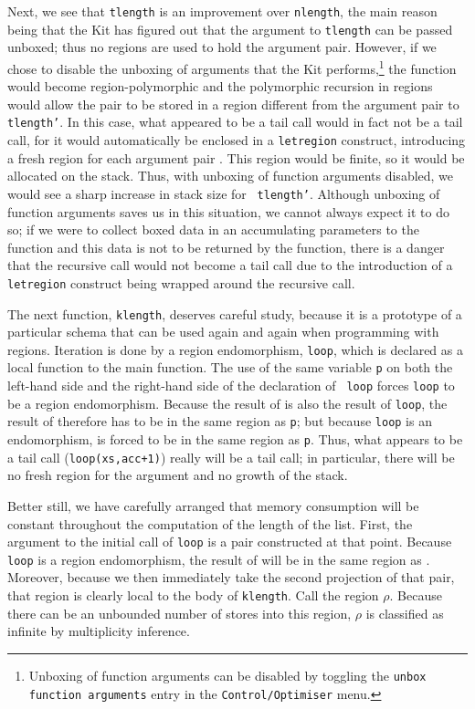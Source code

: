 \documentclass[12pt]{book}
\begin{document}
Next, we see that {\tt tlength} is an improvement over {\tt nlength},
the main reason being that the Kit has figured out that the argument
to {\tt tlength} can be passed unboxed; thus no regions are used to
hold the argument pair. However, if we chose to disable the unboxing
of arguments that the Kit performs,\footnote{Unboxing of function
  arguments can be disabled by toggling the {\tt unbox function
    arguments} entry in the {\tt Control/Optimiser} menu.} the
function would become region-polymorphic and the polymorphic recursion
in regions would allow the pair  to be stored in a
region different from the argument pair to {\tt tlength'}. In this
case, what appeared to be a tail call would in fact not be a tail
call, for it would automatically be enclosed in a {\tt letregion}
construct, introducing a fresh region for each argument pair
.  This region would be finite, so it would be
allocated on the stack.  Thus, with unboxing of function arguments
disabled, we would see a sharp increase in stack size for {\tt
  tlength'}. Although unboxing of function arguments saves us in this
situation, we cannot always expect it to do so; if we were to collect
boxed data in an accumulating parameters to the function and this data
is not to be returned by the function, there is a danger that the
recursive call would not become a tail call due to the introduction of a
{\tt letregion} construct being wrapped around the recursive call.

The next function, {\tt klength}, deserves careful study, because it
is a prototype of a particular schema that can be used again and again
when programming with regions. Iteration is done by a
%
region endomorphism, {\tt loop}, which is declared as a local function
to the main function. The use of the same variable {\tt p} on both the
left-hand side and the right-hand side of the declaration of {\tt
  loop} forces {\tt loop} to be a region endomorphism. Because the
result of  is also the result of {\tt loop}, the
result of  therefore has to be in the same
region as {\tt p}; but because {\tt loop} is an endomorphism,
 is forced to be in the same region as {\tt p}.
Thus, what appears to be a tail call ({\tt loop(xs,acc+1)}) really
will be a tail call; in particular, there will be no fresh region for
the argument and no growth of the stack.

Better still, we have carefully arranged that memory consumption will
be constant throughout the computation of the length of the list.
First, the argument to the initial call of {\tt loop} is a pair
 constructed at that point. Because {\tt loop} is a
region endomorphism, the result of  will be in the
same region as .  Moreover, because we then immediately
take the second projection of that pair, that region is clearly local
to the body of {\tt klength}.  Call the region $\rho$. Because there
can be an unbounded number of stores into this region, $\rho$ is
classified as infinite by multiplicity inference.
\end{document}
